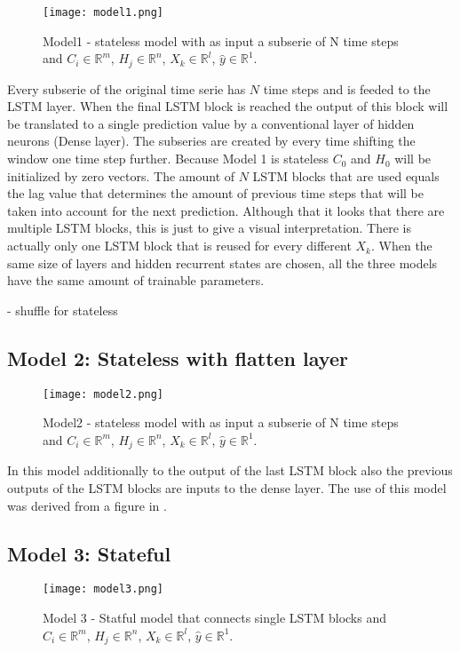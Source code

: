 \begin{figure}[h]
	\centering
	\texttt{[image: model1.png]}
	\caption{Model1 - stateless model with as input a subserie of N time steps and $ C_{i} \in \mathbb{R}^{m} $, $ H_{j} \in \mathbb{R}^{n} $, $ X_{k} \in \mathbb{R}^{l} $, $ \hat{y} \in \mathbb{R}^{1} $.}
	\label{fig:model1}
\end{figure}

Every subserie of the original time serie has $ N $ time steps and is feeded to the LSTM layer. When the final LSTM block is reached the output of this block will be translated to a single prediction value by a conventional layer of hidden neurons (Dense layer). The subseries are created by every time shifting the window one time step further. Because Model 1 is stateless $ C_{0} $ and $ H_{0} $ will be initialized by zero vectors. The amount of $ N $ LSTM blocks that are used equals the lag value that determines the amount of previous time steps that will be taken into account for the next prediction. Although that it looks that there are multiple LSTM blocks, this is just to give a visual interpretation. There is actually only one LSTM block that is reused for every different $ X_{k} $. When the same size of layers and hidden recurrent states are chosen, all the three models have the same amount of trainable parameters. 

- shuffle for stateless
\subsection{Model 2: Stateless with flatten layer}\label{Model2}

\begin{figure}[h]
	\centering
	\texttt{[image: model2.png]}
	\caption{Model2 - stateless model with as input a subserie of N time steps and $ C_{i} \in \mathbb{R}^{m} $, $ H_{j} \in \mathbb{R}^{n} $, $ X_{k} \in \mathbb{R}^{l} $, $ \hat{y} \in \mathbb{R}^{1} $.}
	\label{fig:model2}
\end{figure}

In this model additionally to the output of the last LSTM block also the previous outputs of the LSTM blocks are inputs to the dense layer. The use of this model was derived from a figure in \cite{Kong2019}.

\subsection{Model 3: Stateful}
\begin{figure}[h]
	\centering
	\texttt{[image: model3.png]}
	\caption{Model 3 - Statful model that connects single LSTM blocks and $ C_{i} \in \mathbb{R}^{m} $, $ H_{j} \in \mathbb{R}^{n} $, $ X_{k} \in \mathbb{R}^{l} $, $ \hat{y} \in \mathbb{R}^{1} $.}
	\label{fig:model3}
\end{figure}

